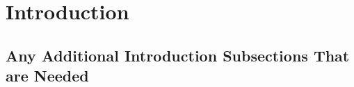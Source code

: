 \clearpage
\section{Introduction}
\OTHTIntroduction

\subsection{Any Additional Introduction Subsections That are Needed}
\OTHTAnyAdditionalIntroduction
